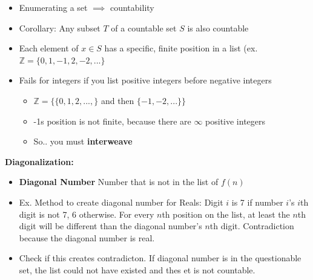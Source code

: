 \documentclass{article}\usepackage{amsmath,amssymb,amsthm,tikz,tkz-graph,color,chngpage,soul,hyperref,csquotes,graphicx,floatrow,circuitikz}\newcommand*{\QEDB}{\hfill\ensuremath{\square}}\newtheorem*{prop}{Proposition}\renewcommand{\theenumi}{\alph{enumi}}\usepackage[shortlabels]{enumitem}\usepackage[nobreak=true]{mdframed}\usetikzlibrary{matrix,calc}\MakeOuterQuote{"}\usepackage[margin=0.75in]{geometry} \newtheorem{theorem}{Theorem}
\begin{document}
\begin{itemize}
    \item Enumerating a set $\implies$ countability
    \item Corollary: Any subset $T$ of a countable set $S$ is also countable
    \item Each element of $x \in S$ has a specific, finite position in a list (ex. $\mathbb{Z} = \{0,1,-1,2,-2,...\}$
    \item Fails for integers if you list positive integers before negative integers
        \begin{itemize}
            \item $\mathbb{Z} = \{\{0,1,2,...,\}$ and then $\{-1,-2,...\}\}$
            \item -1s position is not finite, because there are $\infty$ positive integers
            \item So.. you must \textbf{interweave}
        \end{itemize}
\end{itemize}
\textbf{Diagonalization:}
\begin{itemize}
    \item \textbf{Diagonal Number} Number that is not in the list of $f(n)$
    \item Ex. Method to create diagonal number for Reals: Digit $i$ is 7 if number $i$'s $i$th digit is not 7, 6 otherwise. For every $n$th position on the list, at least the $n$th digit will be different than the diagonal number's $n$th digit. Contradiction because the diagonal number is real.
    \item Check if this creates contradicton. If diagonal number is in the questionable set, the list could not have existed and thes et is not countable.
\end{itemize}
\end{document}

